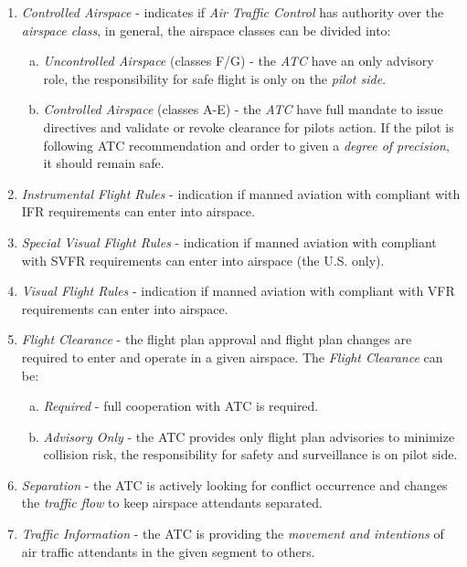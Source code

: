 \begin{enumerate}
    \item \emph{Controlled Airspace} - indicates if \emph{Air Traffic Control} has authority over the \emph{airspace class}, in general, the airspace classes can be divided into:
    \begin{enumerate}[a.]
        \item \emph{Uncontrolled Airspace} (classes  F/G) - the \emph{ATC} have an only advisory role, the responsibility for safe flight is only on the \emph{pilot side}.
        
        \item \emph{Controlled Airspace} (classes A-E) - the \emph{ATC} have full mandate to issue directives and validate or revoke clearance for pilots action. If the pilot is following ATC recommendation and order to given a \emph{degree of precision}, it should remain safe. 
    \end{enumerate}
    
    \item \emph{Instrumental Flight Rules} - indication if manned aviation with compliant with IFR requirements can enter into airspace.
    
    \item \emph{Special Visual Flight Rules} - indication if manned aviation with compliant with SVFR requirements can enter into airspace (the U.S. only).
    
    \item \emph{Visual Flight Rules} - indication if manned aviation with compliant with VFR requirements can enter into airspace.

    \item \emph{Flight Clearance} - the flight plan approval and flight plan changes are required to enter and operate in  a given airspace. The \emph{Flight Clearance} can be:
    \begin{enumerate}[a.]
        \item \emph{Required} - full cooperation with ATC is required. 
        
        \item \emph{Advisory Only} - the ATC provides only flight plan advisories to minimize collision risk, the responsibility for safety and surveillance is on pilot side.
    \end{enumerate}
    
    \item \emph{Separation} - the ATC is actively looking for conflict occurrence and changes the \emph{traffic flow} to keep airspace attendants separated.  
    
    \item \emph{Traffic Information} - the ATC is providing the \emph{movement and intentions} of air traffic attendants in the given segment to others.
    
\end{enumerate}


